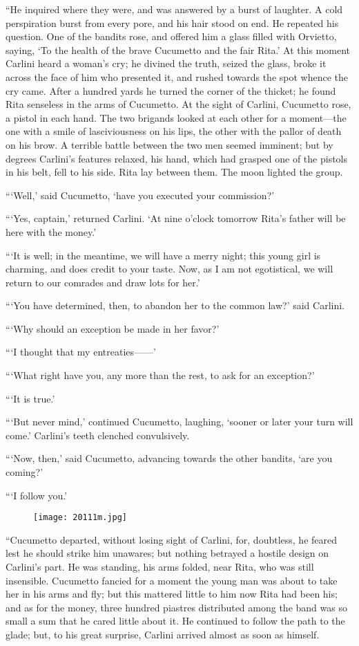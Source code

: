 “He inquired where they were, and was answered by a burst of laughter.
A cold perspiration burst from every pore, and his hair stood on end.
He repeated his question. One of the bandits rose, and offered him a
glass filled with Orvietto, saying, ‘To the health of the brave
Cucumetto and the fair Rita.’ At this moment Carlini heard a woman’s
cry; he divined the truth, seized the glass, broke it across the face
of him who presented it, and rushed towards the spot whence the cry
came. After a hundred yards he turned the corner of the thicket; he
found Rita senseless in the arms of Cucumetto. At the sight of Carlini,
Cucumetto rose, a pistol in each hand. The two brigands looked at each
other for a moment—the one with a smile of lasciviousness on his lips,
the other with the pallor of death on his brow. A terrible battle
between the two men seemed imminent; but by degrees Carlini’s features
relaxed, his hand, which had grasped one of the pistols in his belt,
fell to his side. Rita lay between them. The moon lighted the group.

“‘Well,’ said Cucumetto, ‘have you executed your commission?’

“‘Yes, captain,’ returned Carlini. ‘At nine o’clock tomorrow Rita’s
father will be here with the money.’

“‘It is well; in the meantime, we will have a merry night; this young
girl is charming, and does credit to your taste. Now, as I am not
egotistical, we will return to our comrades and draw lots for her.’

“‘You have determined, then, to abandon her to the common law?’ said
Carlini.

“‘Why should an exception be made in her favor?’

“‘I thought that my entreaties——’

“‘What right have you, any more than the rest, to ask for an
exception?’

“‘It is true.’

“‘But never mind,’ continued Cucumetto, laughing, ‘sooner or later your
turn will come.’ Carlini’s teeth clenched convulsively.

“‘Now, then,’ said Cucumetto, advancing towards the other bandits, ‘are
you coming?’

“‘I follow you.’

\begin{figure}[ht]
\texttt{[image: 20111m.jpg]}
\end{figure}

“Cucumetto departed, without losing sight of Carlini, for, doubtless,
he feared lest he should strike him unawares; but nothing betrayed a
hostile design on Carlini’s part. He was standing, his arms folded,
near Rita, who was still insensible. Cucumetto fancied for a moment the
young man was about to take her in his arms and fly; but this mattered
little to him now Rita had been his; and as for the money, three
hundred piastres distributed among the band was so small a sum that he
cared little about it. He continued to follow the path to the glade;
but, to his great surprise, Carlini arrived almost as soon as himself.

